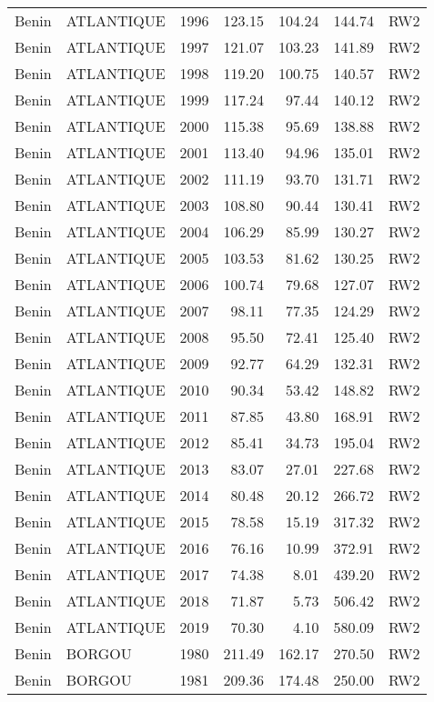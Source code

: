 \begin{longtable}{lllrrrl}
  Benin & ATLANTIQUE & 1996 & 123.15 & 104.24 & 144.74 & RW2 \\ 
  Benin & ATLANTIQUE & 1997 & 121.07 & 103.23 & 141.89 & RW2 \\ 
  Benin & ATLANTIQUE & 1998 & 119.20 & 100.75 & 140.57 & RW2 \\ 
  Benin & ATLANTIQUE & 1999 & 117.24 & 97.44 & 140.12 & RW2 \\ 
  Benin & ATLANTIQUE & 2000 & 115.38 & 95.69 & 138.88 & RW2 \\ 
  Benin & ATLANTIQUE & 2001 & 113.40 & 94.96 & 135.01 & RW2 \\ 
  Benin & ATLANTIQUE & 2002 & 111.19 & 93.70 & 131.71 & RW2 \\ 
  Benin & ATLANTIQUE & 2003 & 108.80 & 90.44 & 130.41 & RW2 \\ 
  Benin & ATLANTIQUE & 2004 & 106.29 & 85.99 & 130.27 & RW2 \\ 
  Benin & ATLANTIQUE & 2005 & 103.53 & 81.62 & 130.25 & RW2 \\ 
  Benin & ATLANTIQUE & 2006 & 100.74 & 79.68 & 127.07 & RW2 \\ 
  Benin & ATLANTIQUE & 2007 & 98.11 & 77.35 & 124.29 & RW2 \\ 
  Benin & ATLANTIQUE & 2008 & 95.50 & 72.41 & 125.40 & RW2 \\ 
  Benin & ATLANTIQUE & 2009 & 92.77 & 64.29 & 132.31 & RW2 \\ 
  Benin & ATLANTIQUE & 2010 & 90.34 & 53.42 & 148.82 & RW2 \\ 
  Benin & ATLANTIQUE & 2011 & 87.85 & 43.80 & 168.91 & RW2 \\ 
  Benin & ATLANTIQUE & 2012 & 85.41 & 34.73 & 195.04 & RW2 \\ 
  Benin & ATLANTIQUE & 2013 & 83.07 & 27.01 & 227.68 & RW2 \\ 
  Benin & ATLANTIQUE & 2014 & 80.48 & 20.12 & 266.72 & RW2 \\ 
  Benin & ATLANTIQUE & 2015 & 78.58 & 15.19 & 317.32 & RW2 \\ 
  Benin & ATLANTIQUE & 2016 & 76.16 & 10.99 & 372.91 & RW2 \\ 
  Benin & ATLANTIQUE & 2017 & 74.38 & 8.01 & 439.20 & RW2 \\ 
  Benin & ATLANTIQUE & 2018 & 71.87 & 5.73 & 506.42 & RW2 \\ 
  Benin & ATLANTIQUE & 2019 & 70.30 & 4.10 & 580.09 & RW2 \\ 
  Benin & BORGOU & 1980 & 211.49 & 162.17 & 270.50 & RW2 \\ 
  Benin & BORGOU & 1981 & 209.36 & 174.48 & 250.00 & RW2 \\ 

\end{longtable}
